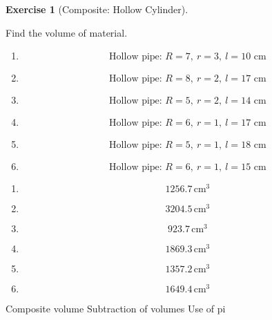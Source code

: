 \documentclass[
  letterpaper,
  DIV=11,
  numbers=noendperiod]{scrreprt}
\theoremstyle{definition}
\newtheorem{exercise}{Exercise}[chapter]
\theoremstyle{remark}
\begin{document}
\begin{exercise}[Composite: Hollow
Cylinder]\protect\hypertarget{exr-comp-5}{}\label{exr-comp-5}

Find the volume of material.

\begin{enumerate}
\def\labelenumi{\alph{enumi})}
\item
  \[\text{Hollow pipe: }R=7,\ r=3,\ l=10\text{ cm}\]
\item
  \[\text{Hollow pipe: }R=8,\ r=2,\ l=17\text{ cm}\]
\item
  \[\text{Hollow pipe: }R=5,\ r=2,\ l=14\text{ cm}\]
\item
  \[\text{Hollow pipe: }R=6,\ r=1,\ l=17\text{ cm}\]
\item
  \[\text{Hollow pipe: }R=5,\ r=1,\ l=18\text{ cm}\]
\item
  \[\text{Hollow pipe: }R=6,\ r=1,\ l=15\text{ cm}\]
\end{enumerate}

\begin{tcolorbox}[enhanced jigsaw, opacitybacktitle=0.6, coltitle=black, arc=.35mm, colframe=quarto-callout-tip-color-frame, colback=white, bottomrule=.15mm, left=2mm, colbacktitle=quarto-callout-tip-color!10!white, titlerule=0mm, opacityback=0, title=\textcolor{quarto-callout-tip-color}{\faLightbulb}\hspace{0.5em}{🔍 View Solution}, leftrule=.75mm, breakable, rightrule=.15mm, bottomtitle=1mm, toptitle=1mm, toprule=.15mm]

\begin{enumerate}
\def\labelenumi{\alph{enumi})}
\item
  \[1256.7\,\text{cm}^{3}\]
\item
  \[3204.5\,\text{cm}^{3}\]
\item
  \[923.7\,\text{cm}^{3}\]
\item
  \[1869.3\,\text{cm}^{3}\]
\item
  \[1357.2\,\text{cm}^{3}\]
\item
  \[1649.4\,\text{cm}^{3}\]
\end{enumerate}

\end{tcolorbox}

{Composite volume} {Subtraction of volumes} {Use of pi}

\end{exercise}
\end{document}
